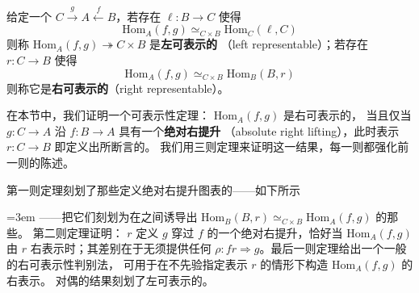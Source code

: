 \begin{definition}\label{def:left-right-representable}
给定一个\trCospan{} $C\xrightarrow{\;g\;}A\xleftarrow{\;f\;}B$，若存在\trFunctor{}%
$\ell\colon B\to C$ 使得
\[
\mathrm{Hom}_A(f,g)\simeq_{C\times B}\mathrm{Hom}_C(\ell,C)
\]
则称\trCommaInfinityCategory{} $\mathrm{Hom}_A(f,g)\twoheadrightarrow C\times B$ 是\textbf{左可表示的}%
（left representable）；若存在\trFunctor{} $r\colon C\to B$ 使得
\[
\mathrm{Hom}_A(f,g)\simeq_{C\times B}\mathrm{Hom}_B(B,r)
\]
则称它是\textbf{右可表示的}（right representable）。%
\end{definition}

在本节中，我们证明一个可表示性定理：\trCommaInfinityCategory{} $\mathrm{Hom}_A(f,g)$ 是右可表示的，%
当且仅当 $g\colon C\to A$ 沿 $f\colon B\to A$ 具有一个\textbf{绝对右提升}%
（absolute right lifting），此时表示\trFunctor{} $r\colon C\to B$ 即定义出所断言的\trLifting{}。%
我们用三则定理来证明这一结果，每一则都强化前一则的陈述。

第一则定理刻划了那些定义绝对右提升图表的\trNaturalTransformation{}——如下所示
\begin{center}
\end{center}
\begingroup
\emergencystretch=3em
——把它们刻划为在\trCommaInfinityCategory{}之间诱导出\trFiberedEquivalence{} $\mathrm{Hom}_B(B,r)\simeq_{C\times B}\allowbreak\mathrm{Hom}_A(f,g)$ 的那些\trNaturalTransformation{}。%
第二则定理证明：\trFunctor{} $r$ 定义 $g$ 穿过 $f$ %
的一个绝对右提升，恰好当 $\mathrm{Hom}_A(f,g)$ 由 $r$ 右表示时；其差别在于无须提供任何%
\trNaturalTransformation{} $\rho\colon fr\Rightarrow g$。最后一则定理给出一个一般的右可表示性判别法，%
可用于在不先验指定表示\trFunctor{} $r$ 的情形下构造 $\mathrm{Hom}_A(f,g)$ 的右表示。%
对偶的结果刻划了左可表示的\trCommaInfinityCategory{}。
\par\endgroup

